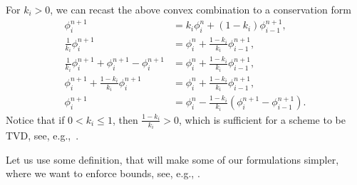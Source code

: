 \documentclass[../thesis.tex]{subfiles}
\begin{document}
For \(k_{i} > 0\), we can recast the above convex combination to a conservation form
\begin{equation}\label{eqn:convex-combination-conservative}
    \begin{split}
        \phi_{i}^{n+1}
        &=
        k_{i}\phi_{i}^{n} + (1-k_{i})\phi_{i-1}^{n+1},
        \\
        \frac{1}{k_{i}}\phi_{i}^{n+1}
        &=
        \phi_{i}^{n} + \frac{1-k_{i}}{k_{i}}\phi_{i-1}^{n+1},
        \\
        \frac{1}{k_{i}}\phi_{i}^{n+1} + \phi_{i}^{n+1} - \phi_{i}^{n+1}
        &=
        \phi_{i}^{n} + \frac{1-k_{i}}{k_{i}}\phi_{i-1}^{n+1},
        \\
        \phi_{i}^{n+1} + \frac{1-k_{i}}{k_{i}}\phi_{i}^{n+1}
        &=
        \phi_{i}^{n} + \frac{1-k_{i}}{k_{i}}\phi_{i-1}^{n+1},
        \\
        \phi_{i}^{n+1}
        &=
        \phi_{i}^{n} - \frac{1-k_{i}}{k_{i}}\left( \phi_{i}^{n+1} - \phi_{i-1}^{n+1} \right).
    \end{split}
\end{equation}
Notice that if \(0 < k_{i} \leq 1\), then \( \frac{1-k_{i}}{k_{i}} > 0\), which is sufficient for a scheme to be TVD, see, e.g.,~\cite{2007_Duraisamy,2023_Frolkovic}.

Let us use some definition, that will make some of our formulations simpler, where we want to enforce bounds, see, e.g., \cite{1989_Huynh_CONF,1993_Huynh}.
\end{document}
